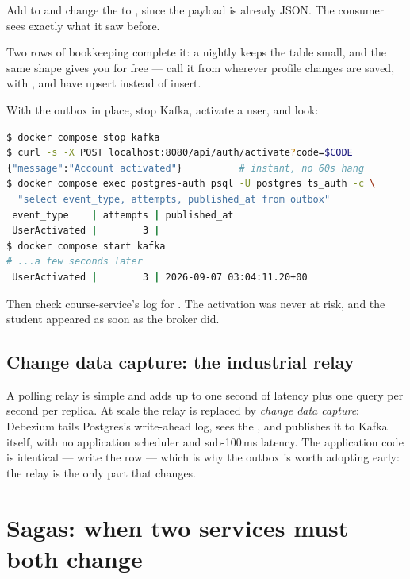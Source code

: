 Add  to  and
change the  to , since the
payload is already JSON. The consumer sees exactly what it saw before.

Two rows of bookkeeping complete it: a nightly
keeps the table small, and the same  shape
gives you  for free --- call it from wherever
profile changes are saved, with , and
have  upsert instead of insert.

\begin{handson}
With the outbox in place, stop Kafka, activate a user, and look:
\begin{lstlisting}[language=bash]
$ docker compose stop kafka
$ curl -s -X POST localhost:8080/api/auth/activate?code=$CODE
{"message":"Account activated"}          # instant, no 60s hang
$ docker compose exec postgres-auth psql -U postgres ts_auth -c \
  "select event_type, attempts, published_at from outbox"
 event_type    | attempts | published_at
 UserActivated |        3 |
$ docker compose start kafka
# ...a few seconds later
 UserActivated |        3 | 2026-09-07 03:04:11.20+00
\end{lstlisting}
Then check course-service's log for . The
activation was never at risk, and the student appeared as soon as the
broker did.
\end{handson}

\subsection{Change data capture: the industrial relay}

A polling relay is simple and adds up to one second of latency plus one
query per second per replica. At scale the relay is replaced by
\emph{change data capture}: Debezium tails Postgres's write-ahead log,
sees the \code{INSERT INTO outbox}, and publishes it to Kafka itself,
with no application scheduler and sub-100\,ms latency. The application
code is identical --- write the row --- which is why the outbox is worth
adopting early: the relay is the only part that changes.

\section{Sagas: when two services must both change}

